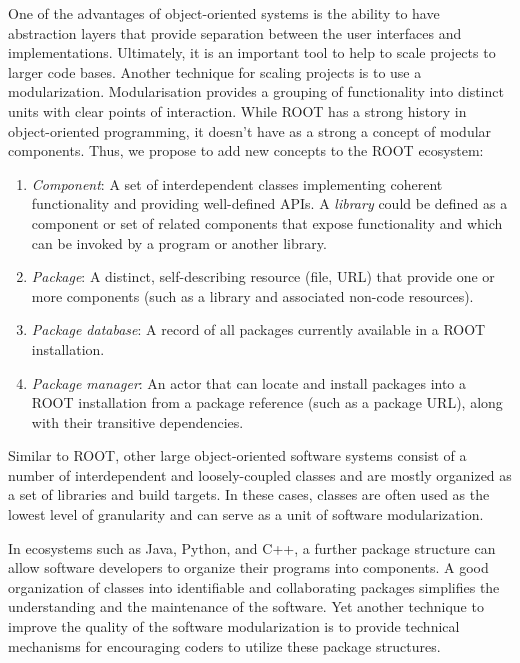 \documentclass{webofc}
\begin{document}
One of the advantages of object-oriented systems is the ability to have abstraction layers that provide separation between the user interfaces and implementations. Ultimately, it is an important tool to help to scale projects to larger code bases. Another technique for scaling projects is to use a modularization. Modularisation provides a grouping of functionality into distinct units with clear points of interaction.  While ROOT \cite{root} has a strong history in object-oriented programming, it doesn’t have as a strong a concept of modular components.  Thus, we propose to add new concepts to the ROOT ecosystem:
\begin{enumerate}
\item \textit{Component}: A set of interdependent classes implementing coherent functionality and providing well-defined APIs. A \textit{library} could be defined as a component or set of related components that expose functionality and which can be invoked by a program or another library.
\item \textit{Package}: A distinct, self-describing resource (file, URL) that provide one or more components (such as a library and associated non-code resources).
\item \textit{Package database}: A record of all packages currently available in a ROOT installation.
\item \textit{Package manager}: An actor that can locate and install packages into a ROOT installation from a package reference (such as a package URL), along with their transitive dependencies.
\end{enumerate}

Similar to ROOT, other large object-oriented software systems consist of a number of interdependent and loosely-coupled classes and are mostly organized as a set of libraries and build targets.  In these cases, classes are often used as the lowest level of granularity and can serve as a unit of software modularization.

In ecosystems such as Java, Python, and C++, a further package structure can allow software developers to organize their programs into components. A good organization of classes into identifiable and collaborating packages simplifies the understanding and the maintenance of the software. Yet another technique to improve the quality of the software modularization is to provide technical mechanisms for encouraging coders to utilize these package structures.

\end{document}
